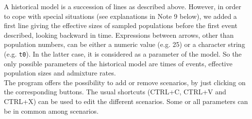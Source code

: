 A historical model is a succession of lines as described above. However,
in order to cope with special situations (see explanations in Note
9 below), we added a first line giving the effective sizes of sampled
populations before the first event described, looking backward in
time. Expressions between arrows, other than population numbers, can
be either a numeric value (e.g. 25) or a character string (e.g. \texttt{t0}).
In the latter case, it is considered as a parameter of the model.
So the only possible parameters of the historical model are times
of events, effective population sizes and admixture rates.\\
 The program offers the possibility to add or remove scenarios, by
just clicking on the corresponding buttons. The usual shortcuts (CTRL+C,
CTRL+V and CTRL+X) can be used to edit the different scenarios. Some
or all parameters can be in common among scenarios.\\


